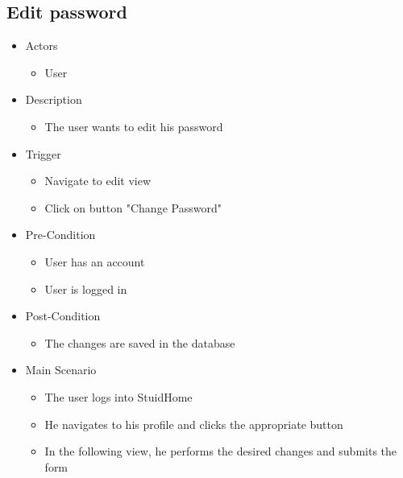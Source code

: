\documentclass[a4paper,11pt]{article}
\begin{document}
\subsection*{Edit password}
\begin{itemize}
	\item Actors
		\begin{itemize}
			\item User
		\end{itemize}
	\item Description
		\begin{itemize}
			\item The user wants to edit his password
		\end{itemize}
	\item Trigger
		\begin{itemize}
			\item Navigate to edit view
			\item Click on button "Change Password"
		\end{itemize}
	\item Pre-Condition
		\begin{itemize}
			\item User has an account
			\item User is logged in
		\end{itemize}
	\item Post-Condition
		\begin{itemize}
			\item The changes are saved in the database
		\end{itemize}
	\item Main Scenario
		\begin{itemize}
			\item The user logs into StuidHome 
			\item He navigates to his profile and clicks the appropriate button
			\item In the following view, he performs the desired changes and submits the form
		\end{itemize}
\end{itemize}
\end{document}
